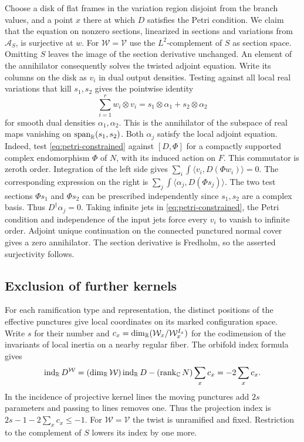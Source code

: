 Choose a disk of flat frames in the variation region disjoint from
the branch values, and a point $x$ there at which $D$ satisfies the
Petri condition. We claim that the equation on nonzero sections,
linearized in sections and variations from $\mathcal A_S$, is surjective
at $w$. For $\mathcal W=\mathcal V$ use the $L^2$-complement of $S$
as section space. Omitting $S$ leaves the image of the section
derivative unchanged. An element of the annihilator consequently
solves the twisted adjoint equation. Write its columns on the disk
as $v_i$ in dual output densities. Testing against all local real
variations that kill $s_1,s_2$ gives the pointwise identity
\begin{equation}\label{eq:petri-constrained}
  \sum_{i=1}^r w_i\otimes v_i
      =s_1\otimes\alpha_1+s_2\otimes\alpha_2
\end{equation}
for smooth dual densities $\alpha_1,\alpha_2$. This is the annihilator
of the subspace of real maps vanishing on
$\operatorname{span}_{\mathbb R}(s_1,s_2)$.
Both $\alpha_j$ satisfy the local adjoint equation. Indeed, test
\eqref{eq:petri-constrained} against $[D,\Phi]$ for a compactly
supported complex endomorphism $\Phi$ of $N$, with its induced action
on $F$. This commutator is zeroth order. Integration of the left
side gives $\sum_i\int\langle v_i,D(\Phi w_i)\rangle=0$.
The corresponding expression on the right is
$\sum_j\int\langle\alpha_j,D(\Phi s_j)\rangle$. The two test sections
$\Phi s_1$ and $\Phi s_2$ can be prescribed independently since
$s_1,s_2$ are a complex basis. Thus $D^\dagger\alpha_j=0$.
Taking infinite jets in \eqref{eq:petri-constrained}, the Petri
condition and independence of the input jets force every $v_i$
to vanish to infinite order. Adjoint unique continuation on the
connected punctured normal cover gives a zero annihilator. The
section derivative is Fredholm, so the asserted surjectivity follows.

\subsection{Exclusion of further kernels}
For each ramification type and representation, the distinct positions
of the effective punctures give local coordinates on its marked
configuration space. Write $s$ for their number and
$c_x=\dim_{\mathbb R}(\mathcal W_x/\mathcal W_x^{I_x})$ for the codimension
of the invariants of local inertia on a nearby regular fiber.
The orbifold index formula \cite[Proposition~2.8.6]{dwbn} gives
\[
  \operatorname{ind}_{\mathbb R}D^{\mathcal W}
   =(\dim_{\mathbb R}\mathcal W)\operatorname{ind}_{\mathbb R}D
       -(\operatorname{rank}_{\mathbb C}N)\sum_x c_x
   =-2\sum_x c_x.
\]
In the incidence of projective kernel lines the moving punctures add
$2s$ parameters and passing to lines removes one. Thus the projection
index is $2s-1-2\sum_x c_x\leq-1$. For $\mathcal W=\mathcal V$ the
twist is unramified and fixed. Restriction to the complement of $S$
lowers its index by one more.


